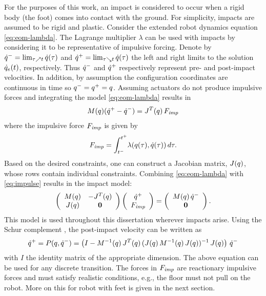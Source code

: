 For the purposes of this work, an impact is considered to occur when a rigid
body (the foot) comes into contact with the ground.
%
For simplicity, impacts are assumed to be rigid and plastic.
%
Consider the extended robot dynamics equation \eqref{eq:eom-lambda}.
%
The Lagrange multiplier $\lambda$ can be used with impacts by considering it to
be representative of impulsive forcing.
%
Denote by $\dot{q}^{-} = \lim_{\tau \nearrow t} \dot{q}(\tau)$ and $\dot{q}^{+} = \lim_{\tau
  \searrow t} \dot{q}(\tau)$ the left and right limits to the solution
$\dot{q}_{e}(t)$, respectively.
%
Thus $\dot{q}^{-}$ and $\dot{q}^{+}$ respectively represent pre- and post-impact velocities.
%
In addition, by assumption the configuration coordinates are continuous in time
so $q^{-} = q^{+} = q$.
%
Assuming actuators do not produce impulsive forces and integrating the model
\eqref{eq:eom-lambda} results in
\begin{align}
  \label{eq:impulse}
  M(q)(\dot{q}^{+} - \dot{q}^{-}) = J^{T}(q) \, F_{\mathit{imp}}
\end{align}
where the impulsive force $F_{\mathit{imp}}$ is given by
\begin{align*}
  F_{\mathit{imp}} = \int_{t^{-}}^{t^{+}} \! \lambda(q(\tau), \dot{q}(\tau)) \, d\tau.
\end{align*}
%
Based on the desired constraints, one can construct a Jacobian matrix,
$J(q)$, whose rows contain individual constraints.
%
Combining \eqref{eq:eom-lambda} with \eqref{eq:impulse} results in the impact
model:
%
\begin{align}
  \left(\begin{array}{c c}
      M(q) & -J^{T}(q)\\
      J(q) & {\mathbf 0}
    \end{array}\right)
  \left(\begin{array}{c}
      \dot{q}^{+}\\
      F_{\mathit{imp}}
    \end{array}\right) =
  \left(\begin{array}{c}
      M(q) \, \dot{q}^{-}\\
      {\mathbf 0}
    \end{array}\right).
  \label{eq:impact-model}
\end{align}
%
This model is used throughout this dissertation wherever impacts arise.
%
Using the Schur complement \cite{Zhang2005}, the post-impact velocity can be
written as
%
\begin{align}
  \label{eq:pmap}
  \dot{q}^{+} = P(q, \dot{q}^{-}) = \left(I - M^{-1}(q) \, J^{T}(q) \,
    (J(q) \, M^{-1}(q) \, J(q))^{-1} \, J(q) \right) \,
  \dot{q}^{-}
\end{align}
%
with $I$ the identity matrix of the appropriate dimension.
%
The above equation can be used for any discrete transition.
%
The forces in $F_{\mathit{imp}}$ are reactionary impulsive forces and must satisfy
realistic conditions, e.g., the floor must not pull on the robot.
%
More on this for robot with feet is given in the next section.

